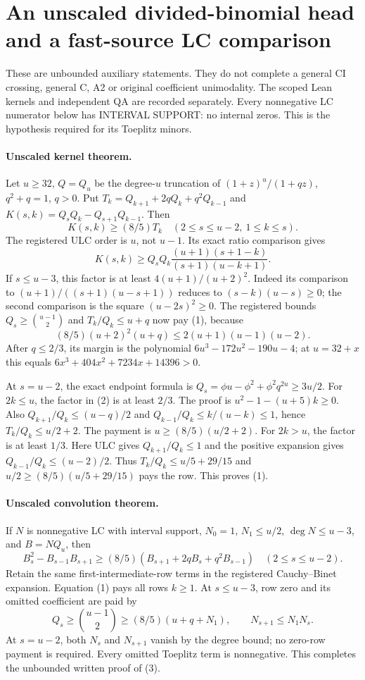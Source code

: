\section{An unscaled divided-binomial head and a fast-source LC comparison}
These are unbounded auxiliary statements. They do not complete a
general CI crossing, general C, A2 or original coefficient unimodality.
The scoped Lean kernels and independent QA are recorded separately.
Every nonnegative LC numerator below has INTERVAL SUPPORT: no internal
zeros. This is the hypothesis required for its Toeplitz minors.

\paragraph{Unscaled kernel theorem.}
Let $u\ge32$, $Q=Q_u$ be the degree-$u$ truncation of
$(1+z)^u/(1+qz)$, $q^2+q=1$, $q>0$. Put
$T_k=Q_{k+1}+2qQ_k+q^2Q_{k-1}$ and
$K(s,k)=Q_sQ_k-Q_{s+1}Q_{k-1}$. Then
\[
 K(s,k)\ge(8/5)T_k\quad
                (2\le s\le u-2,\ 1\le k\le s).      \tag{1}
\]
The registered ULC order is $u$, not $u-1$. Its exact ratio
comparison gives
\[
 K(s,k)\ge Q_sQ_k
       \frac{(u+1)(s+1-k)}{(s+1)(u-k+1)}.             \tag{2}
\]
If $s\le u-3$, this factor is at least
$4(u+1)/(u+2)^2$. Indeed its comparison to
$(u+1)/((s+1)(u-s+1))$ reduces to $(s-k)(u-s)\ge0$;
the second comparison is the square $(u-2s)^2\ge0$.
The registered bounds $Q_s\ge\binom{u-1}{2}$ and
$T_k/Q_k\le u+q$ now pay (1), because
\[
 (8/5)(u+2)^2(u+q)\le2(u+1)(u-1)(u-2).
\]
After $q\le2/3$, its margin is the polynomial
$6u^3-172u^2-190u-4$; at $u=32+x$ this equals
$6x^3+404x^2+7234x+14396>0$.

At $s=u-2$, the exact endpoint formula is
$Q_s=\phi u-\phi^2+\phi^2q^{2u}\ge3u/2$.
For $2k\le u$, the factor in (2) is at least $2/3$.
The proof is $u^2-1-(u+5)k\ge0$. Also
$Q_{k+1}/Q_k\le(u-q)/2$ and
$Q_{k-1}/Q_k\le k/(u-k)\le1$, hence
$T_k/Q_k\le u/2+2$. The payment is
$u\ge(8/5)(u/2+2)$.
For $2k>u$, the factor is at least $1/3$.
Here ULC gives $Q_{k+1}/Q_k\le1$ and the positive expansion
gives $Q_{k-1}/Q_k\le(u-2)/2$. Thus
$T_k/Q_k\le u/5+29/15$ and
$u/2\ge(8/5)(u/5+29/15)$ pays the row. This proves (1).

\paragraph{Unscaled convolution theorem.}
If $N$ is nonnegative LC with interval support, $N_0=1$,
$N_1\le u/2$, $\deg N\le u-3$, and $B=NQ_u$, then
\[
 B_s^2-B_{s-1}B_{s+1}\ge(8/5)
              (B_{s+1}+2qB_s+q^2B_{s-1})
                           \quad(2\le s\le u-2).    \tag{3}
\]
Retain the same first-intermediate-row terms in the registered
Cauchy--Binet expansion. Equation (1) pays all rows $k\ge1$.
At $s\le u-3$, row zero and its omitted coefficient are paid by
\[
 Q_s\ge\binom{u-1}{2}\ge(8/5)(u+q+N_1),
 \qquad N_{s+1}\le N_1N_s.
\]
At $s=u-2$, both $N_s$ and $N_{s+1}$ vanish by the degree
bound; no zero-row payment is required. Every omitted Toeplitz term
is nonnegative. This completes the unbounded written proof of (3).

